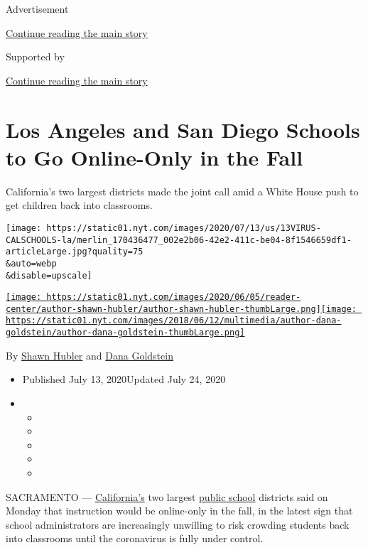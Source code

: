 Advertisement

\protect\hyperlink{after-top}{Continue reading the main story}

Supported by

\protect\hyperlink{after-sponsor}{Continue reading the main story}

\hypertarget{los-angeles-and-san-diego-schools-to-go-online-only-in-the-fall}{%
\section{Los Angeles and San Diego Schools to Go Online-Only in the
Fall}\label{los-angeles-and-san-diego-schools-to-go-online-only-in-the-fall}}

California's two largest districts made the joint call amid a White
House push to get children back into classrooms.

\texttt{[image: https://static01.nyt.com/images/2020/07/13/us/13VIRUS-CALSCHOOLS-la/merlin\_170436477\_002e2b06-42e2-411c-be04-8f1546659df1-articleLarge.jpg?quality=75\\\&auto=webp\\\&disable=upscale]}

\href{https://www.nytimes.com/by/shawn-hubler}{\texttt{[image: https://static01.nyt.com/images/2020/06/05/reader-center/author-shawn-hubler/author-shawn-hubler-thumbLarge.png]}}\href{https://www.nytimes.com/by/dana-goldstein}{\texttt{[image: https://static01.nyt.com/images/2018/06/12/multimedia/author-dana-goldstein/author-dana-goldstein-thumbLarge.png]}}

By \href{https://www.nytimes.com/by/shawn-hubler}{Shawn Hubler} and
\href{https://www.nytimes.com/by/dana-goldstein}{Dana Goldstein}

\begin{itemize}
\item
  Published July 13, 2020Updated July 24, 2020
\item
  \begin{itemize}
  \item
  \item
  \item
  \item
  \item
  \end{itemize}
\end{itemize}

SACRAMENTO ---
\href{https://www.nytimes.com/2020/07/24/us/ca-schools-reopening.html}{California's}
two largest
\href{https://www.nytimes.com/2020/07/24/us/ca-schools-reopening.html}{public
school} districts said on Monday that instruction would be online-only
in the fall, in the latest sign that school administrators are
increasingly unwilling to risk crowding students back into classrooms
until the coronavirus is fully under control.

